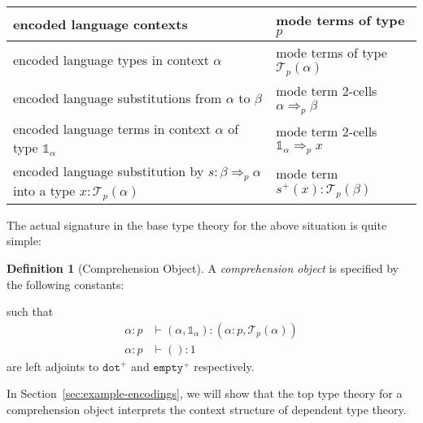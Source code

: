 \documentclass[10pt]{article}
\theoremstyle{definition}
\newtheorem{definition}{Definition}
\newcommand{\yields}{\vdash}
\newcommand{\tcell}{\Rightarrow}
\newcommand{\type}{\,\,\mathsf{mode}}
\newcommand{\sigmacl}[3]{\ensuremath{(#1{:}#2,#3)}}
\newcommand\TrPlus[2]{\ensuremath{{#1}^+(#2)}}
\newcommand\El[2]{\mathcal{T}_{#1}(#2)}
\newcommand{\tdot}{\ensuremath{\mathtt{dot}}}
\newcommand{\tempty}{\ensuremath{\mathtt{empty}}}
\newcommand\One{\ensuremath{\mathds{1}}}
\begin{document}
\begin{center}
\begin{tabular}{|l|l|}
  \hline
  encoded language contexts & mode terms of type $p$ \\
  \hline
  encoded language types in context $\alpha$ & mode terms of type $\El p \alpha$ \\
  \hline
  encoded language substitutions from $\alpha$ to $\beta$ & mode term 2-cells $\alpha \tcell_p \beta$ \\
  \hline
  encoded language terms in context $\alpha$ of type $\One_\alpha$ & mode term 2-cells $\One_\alpha \tcell_p x$ \\
  \hline
  encoded language substitution by $s : \beta \tcell_p \alpha$ into a type $x : \El p \alpha$  & mode term $\TrPlus{s}{x} : \El{p}{\beta}$ \\
  \hline
\end{tabular}
\end{center}

The actual signature in the base type theory for the above situation is quite simple:

\begin{definition}[Comprehension Object]\label{def:comprehension-object}
  A \emph{comprehension object} is specified by the following
  constants:
  such that
\begin{align*}
\alpha : p &\yields (\alpha, \One_\alpha) : \sigmacl{\alpha}{p}{\El{p}{\alpha}} \\
\alpha : p &\yields () : 1
\end{align*}
are left adjoints to $\tdot^+$ and $\tempty^+$ respectively.
\end{definition}

In Section~\ref{sec:example-encodings}, we will show that the top type
theory for a comprehension object interprets the context structure of
dependent type theory.
\end{document}
